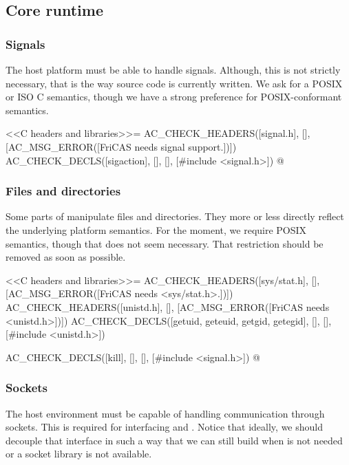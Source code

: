 \documentclass[12pt]{article}
\begin{document}
\subsection{Core runtime}

\subsubsection{Signals}

The host platform must be able to handle signals.  Although, this is
not strictly necessary, that is the way  source code
is currently written.  We ask for a POSIX or ISO C semantics, though
we have a strong preference for POSIX-conformant semantics.

<<C headers and libraries>>=
AC_CHECK_HEADERS([signal.h],
                 [],
                 [AC_MSG_ERROR([FriCAS needs signal support.])])
AC_CHECK_DECLS([sigaction], [], [],
               [#include <signal.h>])
@


\subsubsection{Files and directories}

Some parts of  manipulate files and directories.  They
more or less directly reflect the underlying platform semantics.
For the moment, we require POSIX semantics, though that does not
seem necessary.  That restriction should be removed as soon as possible.

<<C headers and libraries>>=
AC_CHECK_HEADERS([sys/stat.h],
                 [],
		 [AC_MSG_ERROR([FriCAS needs <sys/stat.h>.])])
AC_CHECK_HEADERS([unistd.h], [],
                 [AC_MSG_ERROR([FriCAS needs <unistd.h>])])
AC_CHECK_DECLS([getuid, geteuid, getgid, getegid], [], [],
               [#include <unistd.h>])

AC_CHECK_DECLS([kill], [], [],
               [#include <signal.h>])
@

\subsubsection{Sockets}

The host environment must be capable of handling communication through
sockets.  This is required for interfacing 
and .  Notice that ideally, we should decouple
that interface in such a way that we can still build 
when  is not needed or a socket library is not
available.
\end{document}
